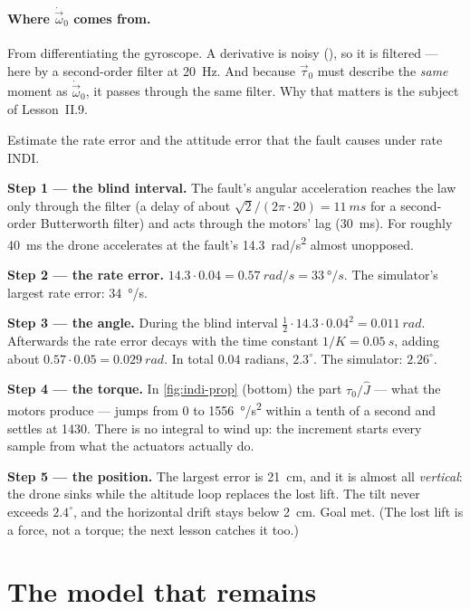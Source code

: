 \paragraph{Where $\dot{\vec\omega}_0$ comes from.} From differentiating the gyroscope. A derivative is noisy (), so it is filtered — here by a second-order filter at \SI{20}{Hz}. And because $\vec\tau_0$ must describe the \emph{same} moment as $\dot{\vec\omega}_0$, it passes through the same filter. Why that matters is the subject of Lesson~II.9.

\begin{example}
\label{ex:indi-catch}
Estimate the rate error and the attitude error that the fault causes under rate INDI.

\textbf{Step 1 — the blind interval.} The fault's angular acceleration reaches the law only through the filter (a delay of about $\sqrt2/(2\pi \cdot 20) = \SI{11}{ms}$ for a second-order Butterworth filter) and acts through the motors' lag (\SI{30}{ms}). For roughly \SI{40}{ms} the drone accelerates at the fault's \SI{14.3}{rad/s^2} almost unopposed.

\textbf{Step 2 — the rate error.} $14.3 \cdot 0.04 = \SI{0.57}{rad/s} = \SI{33}{\degree/s}$. The simulator's largest rate error: \SI{34}{\degree/s}.

\textbf{Step 3 — the angle.} During the blind interval $\tfrac12 \cdot 14.3 \cdot 0.04^2 = \SI{0.011}{rad}$. Afterwards the rate error decays with the time constant $1/K = \SI{0.05}{s}$, adding about $0.57 \cdot 0.05 = \SI{0.029}{rad}$. In total $0.04$ radians, $2.3^\circ$. The simulator: $2.26^\circ$.

\textbf{Step 4 — the torque.} In \cref{fig:indi-prop} (bottom) the part $\tau_0/\hat J$ — what the motors produce — jumps from 0 to \SI{1556}{\degree/s^2} within a tenth of a second and settles at 1430. There is no integral to wind up: the increment starts every sample from what the actuators actually do.

\textbf{Step 5 — the position.} The largest error is \SI{21}{cm}, and it is almost all \emph{vertical}: the drone sinks while the altitude loop replaces the lost lift. The tilt never exceeds $2.4^\circ$, and the horizontal drift stays below \SI{2}{cm}. Goal met. (The lost lift is a force, not a torque; the next lesson catches it too.)
\end{example}

\section{The model that remains}

